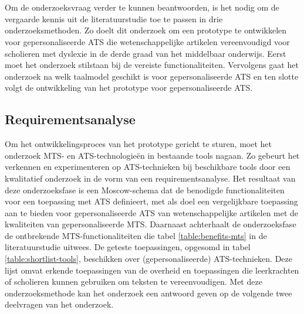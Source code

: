 
\chapter{}%
\label{ch:methodologie}


Om de onderzoeksvraag verder te kunnen beantwoorden, is het nodig om de vergaarde kennis uit de literatuurstudie toe te passen in drie onderzoeksmethoden. Zo doelt dit onderzoek om een prototype te ontwikkelen voor gepersonaliseerde ATS die wetenschappelijke artikelen vereenvoudigd voor scholieren met dyslexie in de derde graad van het middelbaar onderwijs. Eerst moet het onderzoek stilstaan bij de vereiste functionaliteiten. Vervolgens gaat het onderzoek na welk taalmodel geschikt is voor gepersonaliseerde ATS en ten slotte volgt de ontwikkeling van het prototype voor gepersonaliseerde ATS.

\section{Requirementsanalyse}
\label{sec:requirementsanalyse}

Om het ontwikkelingsproces van het prototype gericht te sturen, moet het onderzoek MTS- en ATS-technologieën in bestaande tools nagaan. Zo gebeurt het verkennen en experimenteren op ATS-technieken bij beschikbare tools door een kwalitatief onderzoek in de vorm van een requirementsanalyse. Het resultaat van deze onderzoeksfase is een Moscow-schema dat de benodigde functionaliteiten voor een toepassing met ATS definieert, met als doel een vergelijkbare toepassing aan te bieden voor gepersonaliseerde ATS van wetenschappelijke artikelen met de kwaliteiten van gepersonaliseerde MTS. Daarnaast achterhaalt de onderzoeksfase de ontbrekende MTS-functionaliteiten die tabel \ref{table:benefits-mts} in de literatuurstudie uitwees. De geteste toepassingen, opgesomd in tabel \ref{table:shortlist-tools}, beschikken over (gepersonaliseerde) ATS-technieken. Deze lijst omvat erkende toepassingen van de overheid en toepassingen die leerkrachten of scholieren kunnen gebruiken om teksten te vereenvoudigen. Met deze onderzoeksmethode kan het onderzoek een antwoord geven op de volgende twee deelvragen van het onderzoek.


